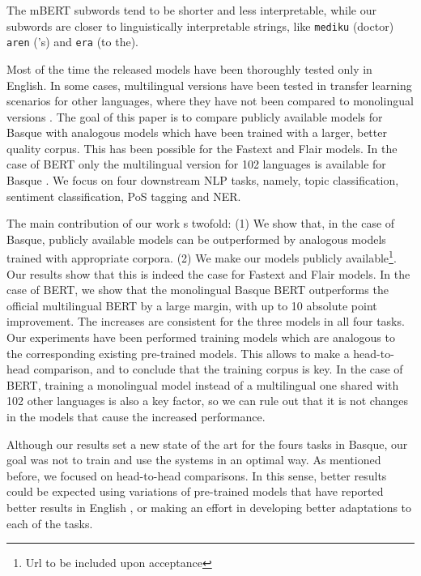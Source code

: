 \documentclass[10pt, a4paper]{article}
\begin{document}
The mBERT subwords tend to be shorter and less interpretable, while our subwords are closer to linguistically interpretable strings, like \texttt{mediku} (doctor) \texttt{aren} ('s) and \texttt{era} (to the).

Most of the time the released models have been thoroughly tested only in English. In some cases, multilingual versions have been tested in transfer learning scenarios for other languages, where they have not been compared to monolingual versions \cite{devlin2019bert}.  
The goal of this paper is to compare publicly available models for Basque with analogous models which have been trained with a larger, better quality corpus. This has been possible for the Fastext and Flair models. In the case of BERT only the multilingual version for 102 languages is available for Basque . We focus on four downstream NLP tasks, namely, topic classification, sentiment classification, PoS tagging and NER.

The main contribution of our work s twofold: (1) We show that, in the case of Basque, publicly available models can be outperformed by analogous models trained with appropriate corpora. (2) We make our models publicly available\footnote{Url to be included upon acceptance}. Our results show that this is indeed the case for Fastext and Flair models. In the case of BERT, we show that the monolingual Basque BERT outperforms the official multilingual BERT by a large margin, with up to 10 absolute point improvement. The increases are consistent for the three models in all four tasks. Our experiments have been performed training models which are analogous to the corresponding existing pre-trained models. This allows to make a head-to-head comparison, and to conclude that the training corpus is key. In the case of BERT, training a monolingual model instead of a multilingual one shared with 102 other languages is also a key factor, so we can rule out that it is not changes in the models that cause the increased performance. 

Although our results set a new state of the art for the fours tasks in Basque, our goal was not to train and use the systems in an optimal way. As mentioned before, we focused on head-to-head comparisons. In this sense, better results could be expected using variations of pre-trained models that have reported better results in English \cite{liu2019roberta}, or making an effort in developing better adaptations to each of the tasks.


\end{document}
